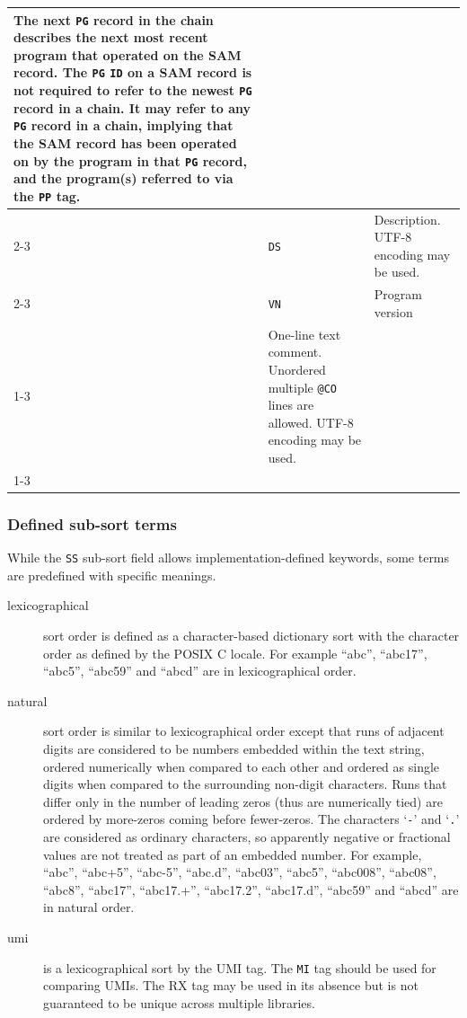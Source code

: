 \documentclass[10pt]{article}
\begin{document}
\begin{center}
\begin{longtable}{|l|l|p{13.5cm}|}
	The next {\tt PG} record in the chain describes the next most recent program that
        operated on the SAM record. The {\tt PG} {\tt ID} on a SAM record is not required
        to refer to the newest {\tt PG} record in a chain.  It may refer to any {\tt PG}
        record in a chain, implying that the SAM record has been operated on by the
        program in that {\tt PG} record, and the program(s) referred to via the {\tt PP} tag. \\\cline{2-3}
  & {\tt DS} & Description.  UTF-8 encoding may be used.\\\cline{2-3}
  & {\tt VN} & Program version \\\cline{1-3}
  \multicolumn{2}{|l}{\tt @CO} & One-line text comment. Unordered multiple {\tt @CO} lines are allowed. UTF-8 encoding may be used.\\
  \cline{1-3}
\end{longtable}
\end{center}

\subsubsection{Defined sub-sort terms}\label{sec:sub-sort}

While the {\tt SS} sub-sort field allows implementation-defined keywords, some terms are predefined with specific meanings.

\begin{description}
\item[lexicographical] sort order is defined as a character-based dictionary sort with the character order as defined by the POSIX C locale.
  For example ``abc'', ``abc17'', ``abc5'', ``abc59'' and ``abcd'' are in lexicographical order.

\item[natural] sort order is similar to lexicographical order except that runs of adjacent digits are considered to be numbers embedded within the text string, ordered numerically when compared to each other and ordered as single digits when compared to the surrounding non-digit characters.
Runs that differ only in the number of leading zeros (thus are numerically tied) are ordered by more-zeros coming before fewer-zeros.
The characters `\texttt{-}' and `\texttt{.}' are considered as ordinary characters, so apparently negative or fractional values are not treated as part of an embedded number.
  For example, ``abc'', ``abc+5'', ``abc-5'', ``abc.d'', ``abc03'', ``abc5'', ``abc008'', ``abc08'', ``abc8'', ``abc17'', ``abc17.+'', ``abc17.2'', ``abc17.d'', ``abc59'' and ``abcd'' are in natural order.

\item[umi] is a lexicographical sort by the UMI tag.
  The {\tt MI} tag should be used for comparing UMIs. The RX tag may be used in its absence but is not guaranteed to be unique across multiple libraries.

\end{description}
\end{document}
